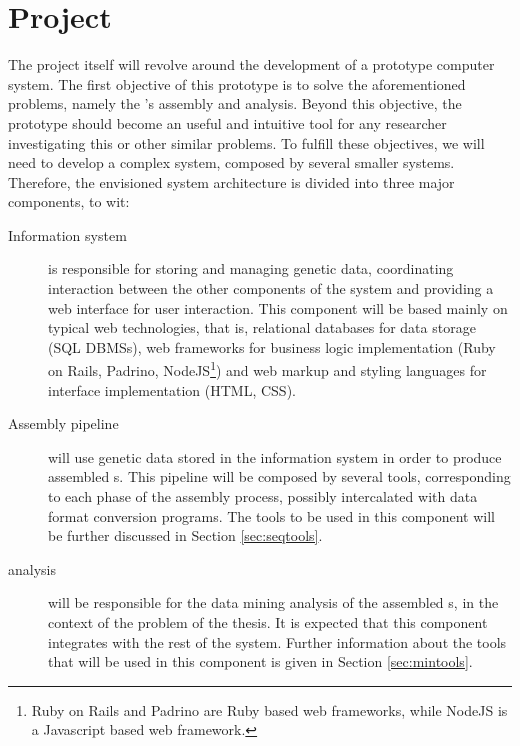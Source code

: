 \section{Project} \label{sec:project}

The project itself will revolve around the development of a prototype computer
system. The first objective of this prototype is to solve the aforementioned
problems, namely the \trans 's assembly and analysis. Beyond this objective, the
prototype should become an useful and intuitive tool for any researcher
investigating this or other similar problems. To fulfill these objectives, we
will need to develop a complex system, composed by several smaller systems.
Therefore, the envisioned system architecture is divided into three major
components, to wit:

\begin{description}

  \item[Information system]
  is responsible for storing and managing genetic data, coordinating interaction
  between the other components of the system and providing a web interface for
  user interaction. This component will be based mainly on typical web
  technologies, that is, relational databases for data storage (SQL DBMSs), web
  frameworks for business logic implementation (Ruby on Rails, Padrino,
  NodeJS\footnote{Ruby on Rails and Padrino are Ruby based web frameworks, while
  NodeJS is a Javascript based web framework.}) and web markup and styling
  languages for interface implementation (HTML, CSS).

  \item[Assembly pipeline]
  will use genetic data stored in the information system in order to produce
  assembled \trans s. This pipeline will be composed by several tools,
  corresponding to each phase of the assembly process, possibly intercalated
  with data format conversion programs. The tools to be used in this component
  will be further discussed in Section \ref{sec:seqtools}.

  \item[\Trans{} analysis]
  will be responsible for the data mining analysis of the assembled \trans s, in
  the context of the problem of the thesis. It is expected that this component
  integrates with the rest of the system. Further information about the tools
  that will be used in this component is given in Section \ref{sec:mintools}.

\end{description}

